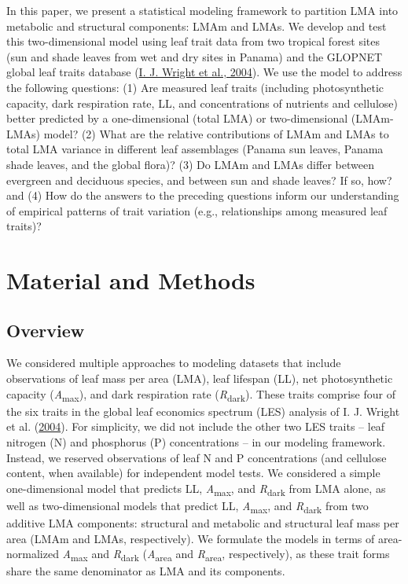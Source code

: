 \documentclass[
  12pt,
  a4paper,
,tablecaptionabove
]{scrartcl}
\begin{document}
In this paper, we present a statistical modeling framework to partition
LMA into metabolic and structural components: LMAm and LMAs. We develop
and test this two-dimensional model using leaf trait data from two
tropical forest sites (sun and shade leaves from wet and dry sites in
Panama) and the GLOPNET global leaf traits database
(\protect\hyperlink{ref-Wright2004a}{I. J. Wright et al., 2004}). We use
the model to address the following questions: (1) Are measured leaf
traits (including photosynthetic capacity, dark respiration rate, LL,
and concentrations of nutrients and cellulose) better predicted by a
one-dimensional (total LMA) or two-dimensional (LMAm-LMAs) model? (2)
What are the relative contributions of LMAm and LMAs to total LMA
variance in different leaf assemblages (Panama sun leaves, Panama shade
leaves, and the global flora)? (3) Do LMAm and LMAs differ between
evergreen and deciduous species, and between sun and shade leaves? If
so, how? and (4) How do the answers to the preceding questions inform
our understanding of empirical patterns of trait variation (e.g.,
relationships among measured leaf traits)?

\hypertarget{material-and-methods}{%
\section{Material and Methods}\label{material-and-methods}}

\hypertarget{overview}{%
\subsection{Overview}\label{overview}}

We considered multiple approaches to modeling datasets that include
observations of leaf mass per area (LMA), leaf lifespan (LL), net
photosynthetic capacity (\emph{A}\textsubscript{max}), and dark
respiration rate (\emph{R}\textsubscript{dark}). These traits comprise
four of the six traits in the global leaf economics spectrum (LES)
analysis of I. J. Wright et al.
(\protect\hyperlink{ref-Wright2004a}{2004}). For simplicity, we did not
include the other two LES traits -- leaf nitrogen (N) and phosphorus (P)
concentrations -- in our modeling framework. Instead, we reserved
observations of leaf N and P concentrations (and cellulose content, when
available) for independent model tests. We considered a simple
one-dimensional model that predicts LL, \emph{A}\textsubscript{max}, and
\emph{R}\textsubscript{dark} from LMA alone, as well as two-dimensional
models that predict LL, \emph{A}\textsubscript{max}, and
\emph{R}\textsubscript{dark} from two additive LMA components:
structural and metabolic and structural leaf mass per area (LMAm and
LMAs, respectively). We formulate the models in terms of area-normalized
\emph{A}\textsubscript{max} and \emph{R}\textsubscript{dark}
(\emph{A}\textsubscript{area} and \emph{R}\textsubscript{area},
respectively), as these trait forms share the same denominator as LMA
and its components.
\end{document}
